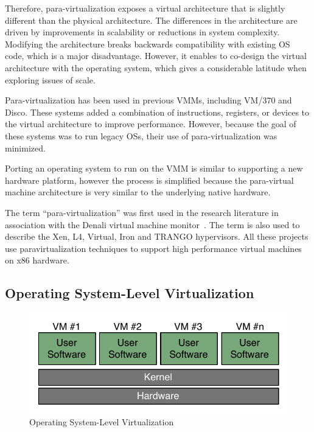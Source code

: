 Therefore, para-virtualization exposes a virtual architecture that is slightly
different than the physical architecture. The differences in the architecture
are driven by improvements in scalability or reductions in system complexity.
Modifying the architecture breaks backwards compatibility with existing OS
code, which is a major disadvantage. However, it enables to co-design the
virtual architecture with the operating system, which gives a considerable
latitude when exploring issues of scale.

Para-virtualization has been used in previous VMMs, including VM/370 and Disco.
These systems added a combination of instructions, registers, or devices to the
virtual architecture to improve performance. However, because the goal of these
systems was to run legacy OSs, their use of para-virtualization was
minimized.~\cite{denali}

Porting an operating system to run on the VMM is similar to supporting a new
hardware platform, however the process is simplified because the para-virtual
machine architecture is very similar to the underlying native hardware.

The term ``para-virtualization'' was first used in the research literature in
association with the Denali virtual machine monitor~\cite{denali}. The term
is also used to describe the Xen, L4, Virtual, Iron and TRANGO hypervisors. All
these projects use paravirtualization techniques to support high performance
virtual machines on x86 hardware.


\subsection{Operating System-Level Virtualization}

\begin{figure}[htb]
	\center
	\includegraphics[scale=0.75]{intro/os-virtualization}
	\caption{Operating System-Level Virtualization}
\end{figure}

